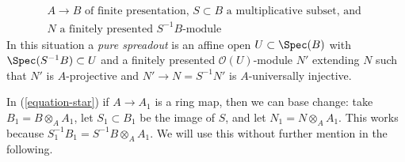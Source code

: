 \begin{equation}
\label{equation-star}
\begin{matrix}
A \to B\text{ of finite presentation, }S \subset B
\text{ a multiplicative subset, and }\\
N\text{ a finitely presented }S^{-1}B\text{-module}
\end{matrix}
\end{equation}
In this situation a {\it pure spreadout} is an affine open
$U \subset \Spec(B)$ with $\Spec(S^{-1}B) \subset U$ and a
finitely presented $\mathcal{O}(U)$-module $N'$ extending $N$
such that $N'$ is $A$-projective and $N' \to N = S^{-1}N'$
is $A$-universally injective.

\medskip\noindent
In (\ref{equation-star}) if $A \to A_1$ is a ring map, then we
can base change: take $B_1 = B \otimes_A A_1$, let $S_1 \subset B_1$
be the image of $S$, and let $N_1 = N \otimes_A A_1$. This works
because $S_1^{-1}B_1 = S^{-1}B \otimes_A A_1$. We will use this
without further mention in the following.
